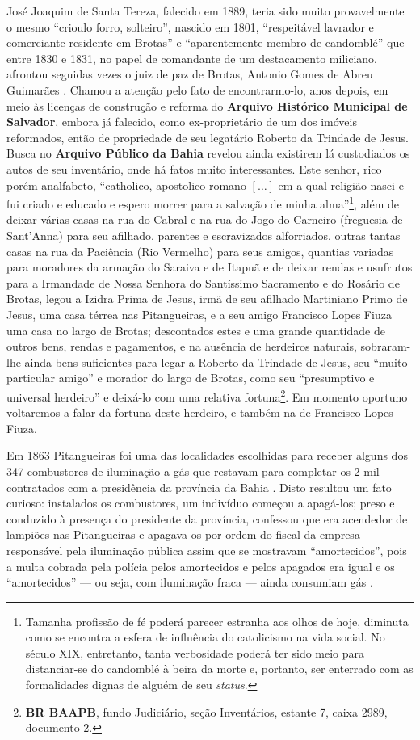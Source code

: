 José Joaquim de Santa Tereza, falecido em 1889, teria sido muito provavelmente o mesmo ``crioulo forro, solteiro'', nascido em 1801, ``respeitável lavrador e comerciante residente em Brotas'' e ``aparentemente membro de candomblé'' que entre 1830 e 1831, no papel de comandante de um destacamento miliciano, afrontou seguidas vezes o juiz de paz de Brotas, Antonio Gomes de Abreu Guimarães \cite[pp.~54-59]{REISSILVA1989}. Chamou a atenção pelo fato de encontrarmo-lo, anos depois, em meio às licenças de construção e reforma do \textbf{Arquivo Histórico Municipal de Salvador}, embora já falecido, como ex-proprietário de um dos imóveis reformados, então de propriedade de seu legatário Roberto da Trindade de Jesus. Busca no \textbf{Arquivo Público da Bahia} revelou ainda existirem lá custodiados os autos de seu inventário, onde há fatos muito interessantes. Este senhor, rico porém analfabeto, ``catholico, apostolico romano \([\dots]\) em a qual religião nasci e fui criado e educado e espero morrer para a salvação de minha alma''\footnote{Tamanha profissão de fé poderá parecer estranha aos olhos de hoje, diminuta como se encontra a esfera de influência do catolicismo na vida social. No século XIX, entretanto, tanta verbosidade poderá ter sido meio para distanciar-se do candomblé à beira da morte e, portanto, ser enterrado com as formalidades dignas de alguém de seu \textit{status}.}, além de deixar várias casas na rua do Cabral e na rua do Jogo do Carneiro (freguesia de Sant'Anna) para seu afilhado, parentes e escravizados alforriados, outras tantas casas na rua da Paciência (Rio Vermelho) para seus amigos, quantias variadas para moradores da armação do Saraiva e de Itapuã e de deixar rendas e usufrutos para a Irmandade de Nossa Senhora do Santíssimo Sacramento e do Rosário de Brotas, legou a Izidra Prima de Jesus, irmã de seu afilhado Martiniano Primo de Jesus, uma casa térrea nas Pitangueiras, e a seu amigo Francisco Lopes Fiuza uma casa no largo de Brotas; descontados estes e uma grande quantidade de outros bens, rendas e pagamentos, e na ausência de herdeiros naturais, sobraram-lhe ainda bens suficientes para legar a Roberto da Trindade de Jesus, seu ``muito particular amigo'' e morador do largo de Brotas, como seu ``presumptivo e universal herdeiro'' e deixá-lo com uma relativa fortuna\footnote{\textbf{BR BAAPB}, fundo Judiciário, seção Inventários, estante 7, caixa 2989, documento 2.}. Em momento oportuno voltaremos a falar da fortuna deste herdeiro, e também na de Francisco Lopes Fiuza.

Em 1863 Pitangueiras foi uma das localidades escolhidas para receber alguns dos 347 combustores de iluminação a gás que restavam para completar os 2 mil contratados com a presidência da província da Bahia \cite[p.~52]{bahia_rpe_1863}. Disto resultou um fato curioso: instalados os combustores, um indivíduo começou a apagá-los; preso e conduzido à presença do presidente da província, confessou que era acendedor de lampiões nas Pitangueiras e apagava-os por ordem do fiscal da empresa responsável pela iluminação pública assim que se mostravam ``amortecidos'', pois a multa cobrada pela polícia pelos amortecidos e pelos apagados era igual e os ``amortecidos'' --- ou seja, com iluminação fraca --- ainda consumiam gás \cite[relat.~chefe~polícia,~p.~25]{bahia_rpe_1870}. 

